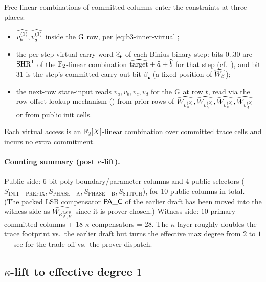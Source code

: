 \begin{remark}\label{rem:b3-virtual-cols}
Free linear combinations of committed columns enter the constraints
at three places:
\begin{itemize}[leftmargin=2em,topsep=2pt]
  \item $\widehat{v_b^{(1)}}, \widehat{v_d^{(1)}}$ inside the $\operatorname{G}$ row, per
        \eqref{eq:b3-inner-virtual};
  \item the per-step virtual carry word $\widehat{c}_\bullet$ of each
        Binius binary step: bits $0..30$ are $\operatorname{SHR}^{1}$ of the
        $\mathbb{F}_2$-linear combination $\widehat{\mathrm{target}} +
        \widehat{a} + \widehat{b}$ for that step (cf.\
        ), and bit $31$ is the step's committed
        carry-out bit $\beta_\bullet$ (a fixed position of $\widehat{W_\beta}$);
  \item the next-row state-input reads $v_a, v_b, v_c, v_d$ for the
        $\operatorname{G}$ at row $t$, read via the row-offset lookup
        mechanism () from prior rows of
        $\widehat{W_{v_a^{(2)}}}, \widehat{W_{v_b^{(2)}}}, \widehat{W_{v_c^{(2)}}},
        \widehat{W_{v_d^{(2)}}}$ or from public init cells.
\end{itemize}
Each virtual access is an $\mathbb{F}_2[X]$-linear combination over committed
trace cells and incurs no extra commitment.
\end{remark}

\paragraph{Counting summary (post $\kappa$-lift).}
Public side: $6$ bit-poly boundary/parameter columns and $4$ public
selectors ($S_{\mathrm{INIT-PREFIX}}, S_{\mathrm{PHASE-A}},
S_{\mathrm{PHASE-B}}, S_{\mathrm{STITCH}}$), for $10$ public columns
in total. (The packed LSB compensator $\mathsf{PA\_C}$ of the earlier
draft has been moved into the witness side as $\widehat{W_{\kappa^{\mathrm{LSB}}_{A,B}}}$
since it is prover-chosen.) Witness side: $10$ primary committed
columns + $18$ $\kappa$ compensators = $28$. The $\kappa$ layer roughly
doubles the trace footprint vs.\ the earlier draft but turns the
effective max degree from $2$ to $1$ — see 
for the trade-off vs.\ the prover dispatch.

\subsection{$\kappa$-lift to effective degree $1$}\label{sec:b3-kappa-lift}


